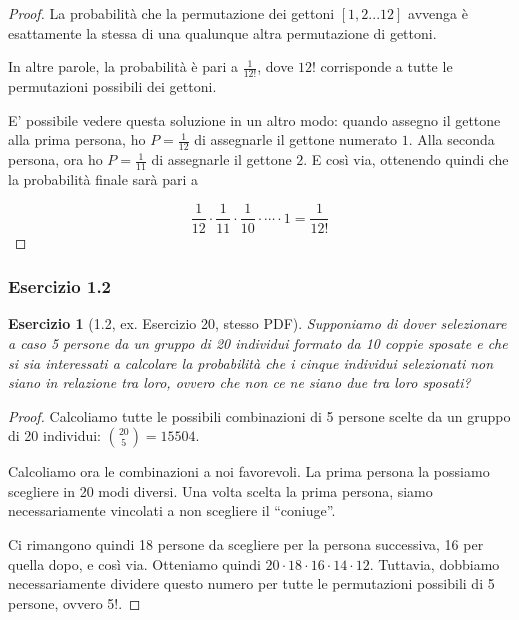\documentclass[handout]{beamer}
\newtheorem{exercise}{Esercizio}
\renewcommand\qedsymbol{$\blacksquare$}
\begin{document}
\begin{frame}

    \begin{proof}
	La probabilità che la permutazione dei gettoni $[1, 2...12]$ avvenga è esattamente la stessa di una qualunque altra permutazione di gettoni.
	
	In altre parole, la probabilità è pari a $\frac{1}{12!}$, dove $12!$ corrisponde a tutte le permutazioni possibili dei gettoni.
	
	\medskip
	
	E' possibile vedere questa soluzione in un altro modo: quando assegno il gettone alla prima persona, ho $P = \frac{1}{12}$ di assegnarle il gettone numerato $1$. Alla seconda persona, ora ho $P =\frac{1}{11}$ di assegnarle il gettone $2$. E così via, ottenendo quindi che la probabilità finale sarà pari a
	
	\[
        \frac{1}{12} \cdot \frac{1}{11} \cdot \frac{1}{10} \cdot \cdots \cdot 1 = \frac{1}{12!}
    \]
    
    \qedhere
\end{proof}

\end{frame}

\begin{frame}[fragile]
	\frametitle{Esercizio 1.2}
	
	\begin{exercise}[1.2, ex. Esercizio 20, stesso PDF]
	Supponiamo di dover selezionare a caso 5 persone da un gruppo di 20 individui formato da 10 coppie sposate e che si sia interessati a calcolare la probabilità che i cinque individui selezionati non siano in relazione tra loro, ovvero che non ce ne siano due tra loro sposati?
    \end{exercise}
\end{frame}

\begin{frame}

    \begin{proof}\renewcommand{\qedsymbol}{$\longrightarrow$}
	Calcoliamo tutte le possibili combinazioni di 5 persone scelte da un gruppo di 20 individui: $\binom{20}{5} = 15504$.
	
	\medskip
	
	Calcoliamo ora le combinazioni a noi favorevoli. La prima persona la possiamo scegliere in 20 modi diversi. Una volta scelta la prima persona, siamo necessariamente vincolati a non scegliere il ``coniuge''.
	
	\medskip
	
	Ci rimangono quindi 18 persone da scegliere per la persona successiva, 16 per quella dopo, e così via. Otteniamo quindi $20 \cdot 18 \cdot 16 \cdot 14 \cdot 12$. Tuttavia, dobbiamo necessariamente dividere questo numero per tutte le permutazioni possibili di 5 persone, ovvero 5!.
	\end{proof}
\end{frame}
\end{document}
